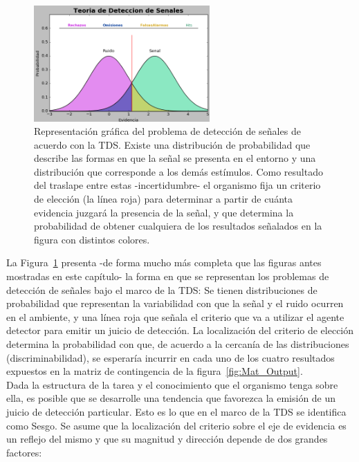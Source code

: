 \begin{figure}[th]
\centering
\includegraphics[width=0.60\textwidth]{Figures/Graficador_Tasas} 
\caption[Posibles Resultados en una Tarea de Detección]{Representación gráfica del problema de detección de señales de acuerdo con la TDS. Existe una distribución de probabilidad que describe las formas en que la señal se presenta en el entorno y una distribución que corresponde a los demás estímulos. Como resultado del traslape entre estas -incertidumbre- el organismo fija un criterio de elección (la línea roja) para determinar a partir de cuánta evidencia juzgará la presencia de la señal, y que determina la probabilidad de obtener cualquiera de los resultados señalados en la figura con distintos colores.}
\label{fig:Graf_Outputs}
\end{figure}

La Figura~\ref{fig:Graf_Outputs} presenta -de forma mucho más completa que las figuras antes mostradas en este capítulo- la forma en que se representan los problemas de detección de señales bajo el marco de la TDS: Se tienen distribuciones de probabilidad que representan la variabilidad con que la señal y el ruido ocurren en el ambiente, y una línea roja que señala el criterio que va a utilizar el agente detector para emitir un juicio de detección. La localización del criterio de elección determina la probabilidad con que, de acuerdo a la cercanía de las distribuciones (discriminabilidad), se esperaría incurrir en cada uno de los cuatro resultados expuestos en la matriz de contingencia de la figura~\ref{fig:Mat_Output}.\\

Dada la estructura de la tarea y el conocimiento que el organismo tenga sobre ella, es posible que se desarrolle una tendencia que favorezca la emisión de un juicio de detección particular. Esto es lo que en el marco de la TDS se identifica como Sesgo. Se asume que la localización del criterio sobre el eje de evidencia es un reflejo del mismo y que su magnitud y dirección depende de dos grandes factores:\\


